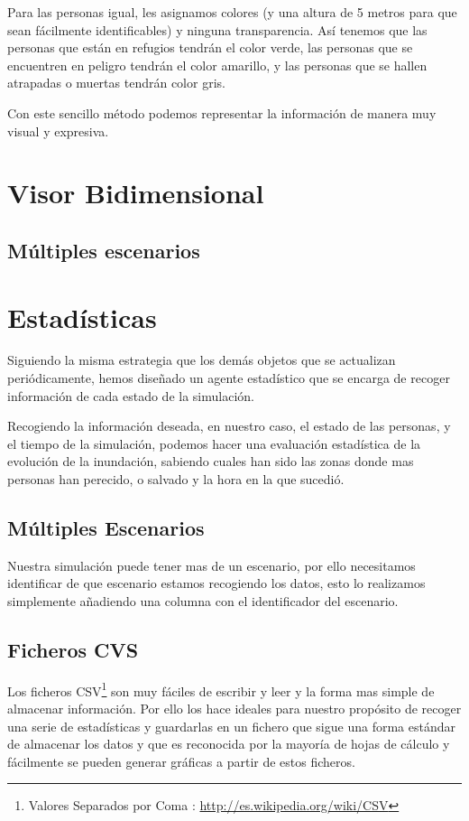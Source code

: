 Para las personas igual, les asignamos colores (y una altura de 5 metros para
que sean fácilmente identificables) y ninguna transparencia.
Así tenemos que las personas que están en refugios tendrán el color verde, las
personas que se encuentren en peligro tendrán el color amarillo, y las personas
que se hallen atrapadas o muertas tendrán color gris.

Con este sencillo método podemos representar la información de manera muy
visual y expresiva.
\section*{Visor Bidimensional}
\subsection*{Múltiples escenarios}
\section*{Estadísticas}
Siguiendo la misma estrategia que los demás objetos que se actualizan
periódicamente, hemos diseñado un agente estadístico que se encarga de recoger
información de cada estado de la simulación.

Recogiendo la información deseada, en nuestro caso, el estado de las personas,
y el tiempo de la simulación, podemos hacer una evaluación estadística de la
evolución de la inundación, sabiendo cuales han sido las zonas donde mas
personas han perecido, o salvado y la hora en la que sucedió.
\subsection*{Múltiples Escenarios}
Nuestra simulación puede tener mas de un escenario, por ello necesitamos
identificar de que escenario estamos recogiendo los datos, esto lo realizamos
simplemente añadiendo una columna con el identificador del escenario.
\subsection*{Ficheros CVS}
Los ficheros CSV\footnote{Valores Separados por Coma :
\url{http://es.wikipedia.org/wiki/CSV}} son muy fáciles de escribir y leer y la
forma mas simple de almacenar información. Por ello los hace ideales para
nuestro propósito de recoger una serie de estadísticas y guardarlas en un
fichero que sigue una forma estándar de almacenar los datos y que es reconocida
por la mayoría de hojas de cálculo y fácilmente se pueden generar gráficas a 
partir de estos ficheros.